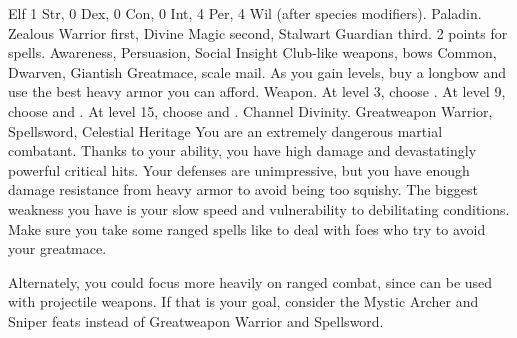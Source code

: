              Elf
             1 Str, 0 Dex, 0 Con, 0 Int, 4 Per, 4 Wil (after species modifiers).
             Paladin.
             Zealous Warrior first, Divine Magic second, Stalwart Guardian third.
             2 points for spells.
             Awareness, Persuasion, Social Insight
             Club-like weapons, bows
             Common, Dwarven, Giantish
             Greatmace, scale mail. As you gain levels, buy a longbow and use the best heavy armor you can afford.
             Weapon.
                At level 3, choose .
                At level 9, choose  and .
                At level 15, choose  and .
             Channel Divinity.
             Greatweapon Warrior, Spellsword, Celestial Heritage
             You are an extremely dangerous martial combatant.
            Thanks to your  ability, you have high damage and devastatingly powerful critical hits.
            Your defenses are unimpressive, but you have enough damage resistance from heavy armor to avoid being too squishy.
            The biggest weakness you have is your slow speed and vulnerability to debilitating conditions.
            Make sure you take some ranged spells like  to deal with foes who try to avoid your greatmace.

            Alternately, you could focus more heavily on ranged combat, since  can be used with projectile weapons.
            If that is your goal, consider the Mystic Archer and Sniper feats instead of Greatweapon Warrior and Spellsword.
